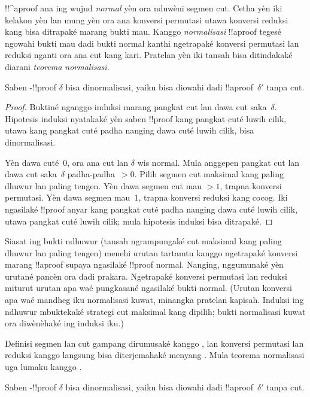 \documentclass[../../../include/open-logic-section]{subfiles}
\begin{document}


!!^a{proof} ana ing wujud \emph{normal} yèn ora nduwèni segmen cut.
Cetha yèn iki kelakon yèn lan mung yèn ora ana konversi permutasi
utawa konversi reduksi kang bisa ditrapaké marang bukti mau. Kanggo
\emph{normalisasi} !!a{proof} tegesé ngowahi bukti mau dadi bukti
normal kanthi ngetrapaké konversi permutasi lan reduksi nganti ora
ana cut kang kari. Pratelan yèn iki tansah bisa ditindakaké diarani
\emph{teorema normalisasi}.

\begin{thm} Saben -!!{proof}
$\delta$ bisa dinormalisasi, yaiku bisa diowahi dadi
!!a{proof}~$\delta'$ tanpa cut.
\end{thm}

\begin{proof}
  Buktiné nganggo induksi marang pangkat cut lan dawa cut
  saka~$\delta$. Hipotesis induksi nyatakaké yèn saben !!{proof}
  kang pangkat cuté luwih cilik, utawa kang pangkat cuté padha
  nanging dawa cuté luwih cilik, bisa dinormalisasi.

  Yèn dawa cuté~$0$, ora ana cut lan $\delta$ wis normal.
  Mula anggepen pangkat cut lan dawa cut saka~$\delta$
  padha-padha~$> 0$. Pilih segmen cut maksimal kang paling
  dhuwur lan paling tengen. Yèn dawa segmen cut mau $>1$,
  trapna konversi permutasi. Yèn dawa segmen mau~$1$,
  trapna konversi reduksi kang cocog. Iki ngasilaké !!{proof}
  anyar kang pangkat cuté padha nanging dawa cuté luwih cilik,
  utawa pangkat cuté luwih cilik; mula hipotesis induksi bisa
  ditrapaké.
\end{proof}

Siasat ing bukti ndhuwur (tansah ngrampungaké cut maksimal kang
paling dhuwur lan paling tengen) menehi urutan tartamtu kanggo
ngetrapaké konversi marang !!a{proof} supaya ngasilaké !!{proof}
normal. Nanging, nggumunaké yèn urutané pancèn ora dadi prakara.
Ngetrapaké konversi permutasi lan reduksi miturut urutan apa waé
pungkasané ngasilaké bukti normal.
(Urutan konversi apa waé mandheg iku normalisasi kuwat, minangka pratelan kapisah. Induksi ing ndhuwur mbuktekaké strategi cut maksimal kang dipilih; bukti normalisasi kuwat ora diwènèhaké ing induksi iku.)

Definisi segmen lan cut gampang dirumusaké kanggo , lan
konversi permutasi lan reduksi kanggo  langsung bisa
diterjemahaké menyang . Mula teorema normalisasi uga
lumaku kanggo .

\begin{thm} Saben -!!{proof}
$\delta$ bisa dinormalisasi, yaiku bisa diowahi dadi
!!a{proof}~$\delta'$ tanpa cut.
\end{thm}
\end{document}
